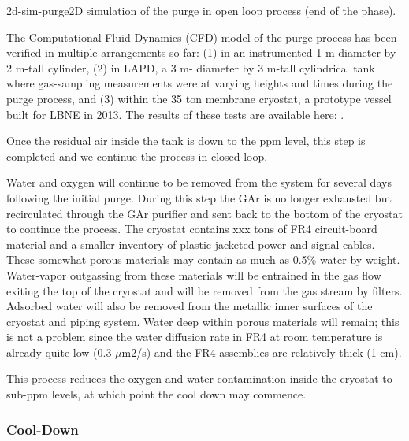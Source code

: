 \begin{cdrfigure}{2d-sim-purge}{2D simulation of the purge in open loop process (end of the phase).} 
\end{cdrfigure}

The Computational Fluid Dynamics (CFD) model of the purge process has been verified in multiple arrangements so far: (1) in an instrumented 1 m-diameter by 2 m-tall cylinder, (2) in LAPD, a 3 m- diameter by 3 m-tall cylindrical tank where gas-sampling measurements were at varying heights and times during the purge process, and (3) within the 35 ton membrane cryostat, a prototype vessel built for LBNE in 2013. The results of these tests are available here: . 

Once the residual air inside the tank is down to the ppm level, this step is completed and we continue the process in closed loop. 


Water and oxygen will continue to be removed from the system for several days following the initial purge. During this step the GAr is no longer exhausted but recirculated through the GAr purifier and sent back to the bottom of the cryostat to continue the process. The cryostat contains xxx tons of FR4 circuit-board material and a smaller inventory of plastic-jacketed power and signal cables. These somewhat porous materials may contain as much as 0.5\% water by weight. Water-vapor outgassing from these materials will be entrained in the gas flow exiting the top of the cryostat and will be removed from the gas stream by filters. Adsorbed water will also be removed from the metallic inner surfaces of the cryostat and piping system. Water deep within porous materials will remain; this is not a problem since the water diffusion rate in FR4 at room temperature is already quite low (0.3 $\mu$m2/s)  and the FR4 assemblies are relatively thick (1 cm).

This process reduces the oxygen and water contamination inside the cryostat to sub-ppm levels, at which point the cool down may commence.

\subsubsection{Cool-Down}

